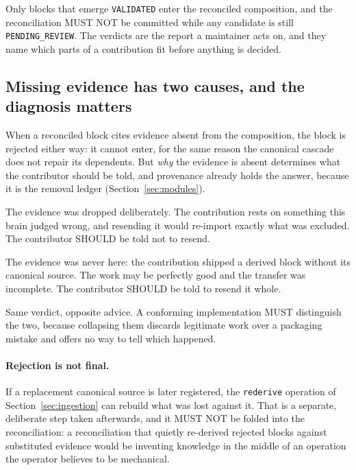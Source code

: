 \documentclass[11pt,a4paper]{article}
\begin{document}
Only blocks that emerge \texttt{VALIDATED} enter the reconciled composition, and
the reconciliation MUST NOT be committed while any candidate is still
\texttt{PENDING\_REVIEW}. The verdicts are the report a maintainer acts on, and
they name which parts of a contribution fit before anything is decided.

\subsection{Missing evidence has two causes, and the diagnosis matters}
\label{sec:missing-evidence}

When a reconciled block cites evidence absent from the composition, the block is
rejected either way: it cannot enter, for the same reason the canonical cascade
does not repair its dependents. But \emph{why} the evidence is absent determines
what the contributor should be told, and provenance already holds the answer,
because it is the removal ledger (Section~\ref{sec:modules}).

\begin{description}[leftmargin=2.2em, style=sameline, font=\normalfont\bfseries]
  \item[A removal record exists.] The evidence was dropped deliberately. The
  contribution rests on something this brain judged wrong, and resending it would
  re-import exactly what was excluded. The contributor SHOULD be told not to
  resend.
  \item[No record, and the identity is unknown.] The evidence was never here: the
  contribution shipped a derived block without its canonical source. The work may
  be perfectly good and the transfer was incomplete. The contributor SHOULD be
  told to resend it whole.
\end{description}

Same verdict, opposite advice. A conforming implementation MUST distinguish the
two, because collapsing them discards legitimate work over a packaging mistake
and offers no way to tell which happened.

\paragraph{Rejection is not final.}
If a replacement canonical source is later registered, the \texttt{rederive}
operation of Section~\ref{sec:ingestion} can rebuild what was lost against it.
That is a separate, deliberate step taken afterwards, and it MUST NOT be folded
into the reconciliation: a reconciliation that quietly re-derived rejected blocks
against substituted evidence would be inventing knowledge in the middle of an
operation the operator believes to be mechanical.
\end{document}
